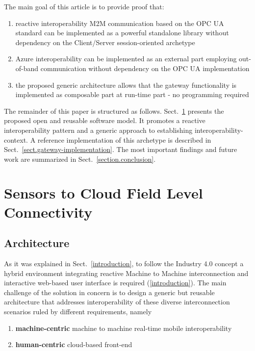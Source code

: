 \documentclass{jacsart}
\begin{document}
The main goal of this article is to provide proof that:

\begin{enumerate}
      \item  reactive interoperability M2M communication based on the OPC UA standard can be implemented as a powerful standalone library without dependency on the Client/Server session-oriented archetype
      \item Azure interoperability can be implemented as an external part employing out-of-band communication without dependency on the OPC UA implementation
      \item the proposed generic architecture allows that the gateway functionality is implemented as composable part at run-time part - no programming required
\end{enumerate}

The remainder of this paper is structured as follows. Sect.~\ref*{cloud-to-sensors-field-level-connectivity} presents the proposed open and reusable software model. It promotes a reactive interoperability pattern and a generic approach to establishing interoperability-context. A reference implementation of this archetype is described in Sect.~\ref*{sect.gateway-implementation}. The most important findings and future work are summarized in Sect.~\ref*{section.conclusion}.

\section{Sensors to Cloud Field Level Connectivity}\label{cloud-to-sensors-field-level-connectivity}

\subsection{Architecture}\label{subs.architecture}

As it was explained in Sect.~\ref*{introduction}, to follow the Industry 4.0 concept a hybrid environment integrating reactive Machine to Machine interconnection and interactive web-based user interface is required (\ref*{introduction}). The main challenge of the solution in concern is to design a generic but reusable architecture that addresses interoperability of these diverse interconnection scenarios ruled by different requirements, namely

\begin{enumerate}
      \item \textbf{machine-centric} machine to machine real-time mobile interoperability
      \item \textbf{human-centric} cloud-based front-end
\end{enumerate}
\end{document}
